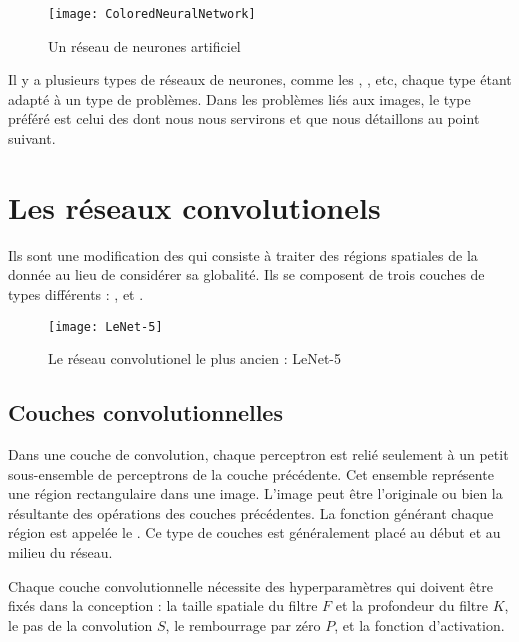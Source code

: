 \begin{figure}[H]
\begin{center}
\texttt{[image: ColoredNeuralNetwork]}
\caption{Un réseau de neurones artificiel}{\cite{commonsANN}}
\end{center}
\end{figure}

Il y a plusieurs types de réseaux de neurones, comme
les , , etc,
chaque type étant adapté à un type de problèmes.
Dans les problèmes liés aux images, le type préféré est celui des
 dont nous nous servirons et que nous détaillons
au point suivant.

\section{Les réseaux convolutionels}

Ils sont une modification des  qui consiste à
traiter des régions spatiales de la donnée au lieu de considérer sa globalité.
Ils se composent de trois couches de types différents :
,
 et
.

\begin{figure}[h]
\begin{center}
\texttt{[image: LeNet-5]}
\caption{Le réseau convolutionel le plus ancien : LeNet-5}{\cite{lecun1998gradient}}
\end{center}
\end{figure}

\subsection{Couches convolutionnelles}

Dans une couche de convolution, chaque perceptron est relié seulement à un petit
sous-ensemble de perceptrons de la couche précédente. Cet ensemble représente
une région rectangulaire dans une image. L'image peut être l'originale ou
bien la résultante des opérations des couches précédentes. La fonction générant
chaque région est appelée le . Ce type de couches est généralement
placé au début et au milieu du réseau.

Chaque couche convolutionnelle nécessite des hyperparamètres qui doivent
être fixés dans la conception : la taille spatiale du filtre $F$ et la
profondeur du filtre $K$, le pas de la convolution $S$, le rembourrage par zéro
$P$, et la fonction d'activation.

